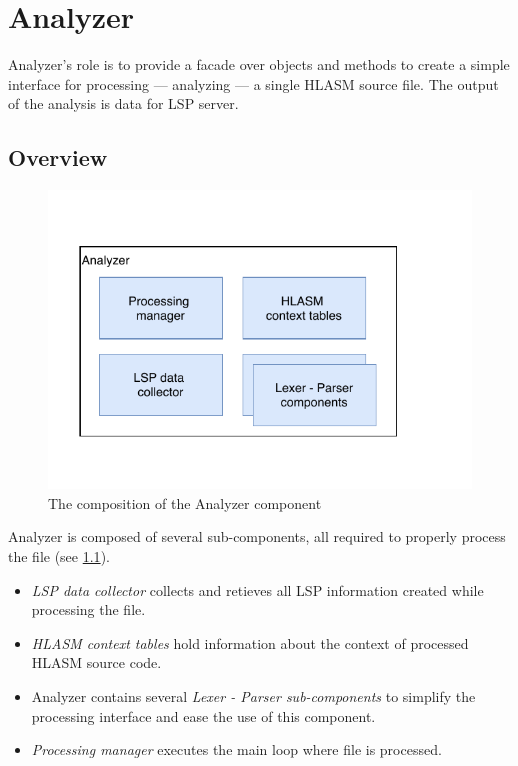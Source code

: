 \chapter {Analyzer}

Analyzer's role is to provide a facade over objects and methods to create a simple interface for processing --- analyzing --- a single HLASM source file. The output of the analysis is data for LSP server.

\section{Overview}

\begin{figure}
	\centering
	\includegraphics[width=\textwidth / 2]{img/analyzer_arch}
	\caption{The composition of the Analyzer component}
	\label{fig06:analyzer}
\end{figure}

Analyzer is composed of several sub-components, all required to properly process the file (see \cref{fig06:analyzer}). 
\begin{itemize}
	\item \emph{LSP data collector} collects and retieves all LSP information created while processing the file.
	\item \emph{HLASM context tables} hold information about the context of processed HLASM source code.
	\item Analyzer contains several \emph{Lexer - Parser sub-components} to simplify the processing interface and ease the use of this component.
	\item \emph{Processing manager} executes the main loop where file is processed.
\end{itemize}

